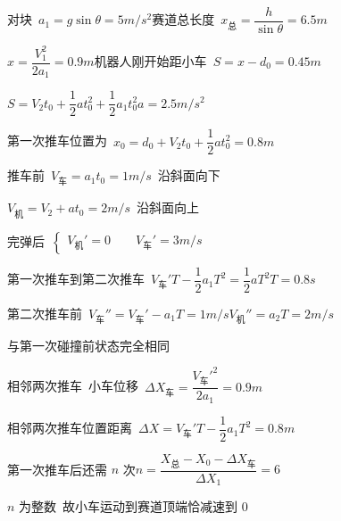 对块\ $a_1=g\sin\theta=5\unit{m/s^2}$\qquad 赛道总长度\ $x_{\text{总}}=\dfrac{h}{\sin\theta}=6.5\unit{m}$

$x=\dfrac{V_1^2}{2a_1}=0.9\unit{m}$\qquad 机器人刚开始距小车\ $S=x-d_0=0.45\unit{m}$

$S=V_2t_0+\dfrac12at_0^2+\dfrac12a_1t_0^2$\qquad $a=2.5\unit{m/s^2}$

第一次推车位置为\ $x_0=d_0+V_2t_0+\dfrac12at_0^2=0.8\unit{m}$

推车前\ $V_{\text{车}}=a_1t_0=1\unit{m/s}$\ 沿斜面向下

$V_{\text{机}}=V_2+at_0=2\unit{m/s}$\ 沿斜面向上

完弹后\ $\left\{\begin{array}{l}V_{\text{机}}'=0\qquad V_{\text{车}}'=3\unit{m/s}\end{array}\right.$

第一次推车到第二次推车\ $V_{\text{车}}'T-\dfrac12a_1T^2=\dfrac12aT^2$\qquad $T=0.8\unit{s}$

第二次推车前\ $V_{\text{车}}''=V_{\text{车}}'-a_1T=1\unit{m/s}$\qquad $V_{\text{机}}''=a_2T=2\unit{m/s}$ %

与第一次碰撞前状态完全相同

相邻两次推车\ 小车位移\ $\Delta X_{\text{车}}=\dfrac{V_{\text{车}}'^2}{2a_1}=0.9\unit{m}$

相邻两次推车位置距离\ $\Delta X=V_{\text{车}}'T-\dfrac12a_1T^2=0.8\unit{m}$

第一次推车后还需 $n$ 次\qquad $n=\dfrac{X_{\text{总}}-X_0-\Delta X_{\text{车}}}{\Delta X_1}=6$

$n$ 为整数\ 故小车运动到赛道顶端恰减速到 $0$

